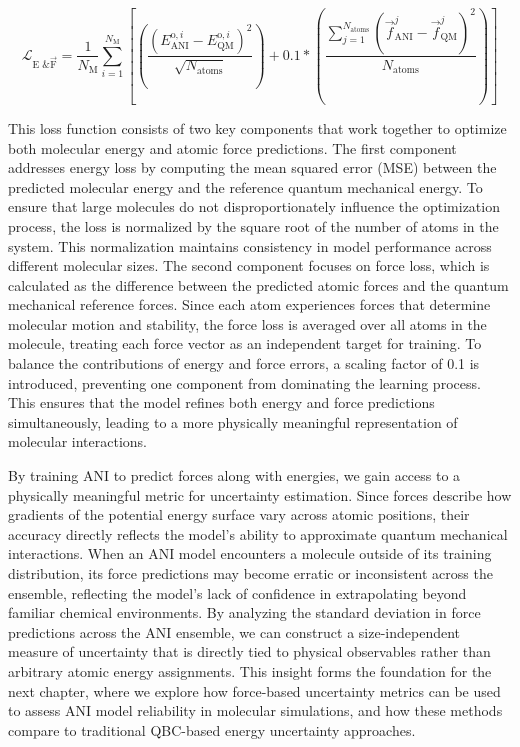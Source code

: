 \begin{equation}
\mathcal{L}_{\text{E \& }\vec{\text{F}}} = 
\frac{1}{N_{\text{M}}} 
\sum_{i=1}^{N_\text{M}} 
\left[ \left( \frac{
\left( E_{\text{ANI}}^{\text{o},i} - E_{\text{QM}}^{\text{o},i} \right)^2}
{\sqrt{N_{\text{atoms}}}} \right)
+ 0.1 \ast \left( 
\frac{\sum_{j=1}^{N_{\text{atoms}}} 
\left( \vec{f}_{\text{ANI}}^{j} - \vec{f}_{\text{QM}}^{j}\right)^2}{N_{\text{atoms}}} 
\right) \right]
\label{eq:force_loss}
\end{equation}

This loss function consists of two key components that work together to optimize both molecular energy and atomic force predictions. The first component addresses energy loss by computing the mean squared error (MSE) between the predicted molecular energy and the reference quantum mechanical energy. To ensure that large molecules do not disproportionately influence the optimization process, the loss is normalized by the square root of the number of atoms in the system. This normalization maintains consistency in model performance across different molecular sizes. The second component focuses on force loss, which is calculated as the difference between the predicted atomic forces and the quantum mechanical reference forces. Since each atom experiences forces that determine molecular motion and stability, the force loss is averaged over all atoms in the molecule, treating each force vector as an independent target for training. To balance the contributions of energy and force errors, a scaling factor of 0.1 is introduced, preventing one component from dominating the learning process. This ensures that the model refines both energy and force predictions simultaneously, leading to a more physically meaningful representation of molecular interactions.

By training ANI to predict forces along with energies, we gain access to a physically meaningful metric for uncertainty estimation. Since forces describe how gradients of the potential energy surface vary across atomic positions, their accuracy directly reflects the model's ability to approximate quantum mechanical interactions.
When an ANI model encounters a molecule outside of its training distribution, its force predictions may become erratic or inconsistent across the ensemble, reflecting the model’s lack of confidence in extrapolating beyond familiar chemical environments. By analyzing the standard deviation in force predictions across the ANI ensemble, we can construct a size-independent measure of uncertainty that is directly tied to physical observables rather than arbitrary atomic energy assignments.
This insight forms the foundation for the next chapter, where we explore how force-based uncertainty metrics can be used to assess ANI model reliability in molecular simulations, and how these methods compare to traditional QBC-based energy uncertainty approaches.